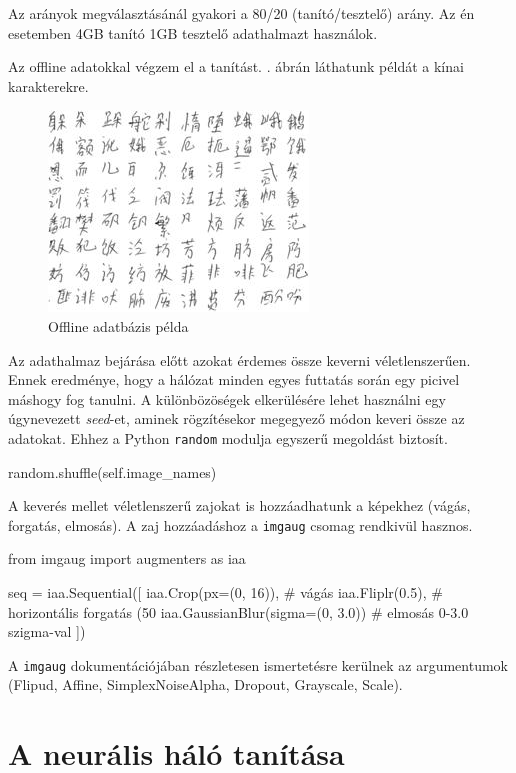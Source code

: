 Az arányok megválasztásánál gyakori a 80/20 (tanító/tesztelő) arány. Az én esetemben 4GB tanító 1GB tesztelő adathalmazt használok.

Az offline adatokkal végzem el a tanítást. . ábrán láthatunk példát a kínai karakterekre.

\begin{figure}[h]
	\centering
	\includegraphics[scale=2.0]{images/offline_dataset}
	\caption{Offline adatbázis példa}
	\label{fig:offline_dataset}
\end{figure} 

Az adathalmaz bejárása előtt azokat érdemes össze keverni véletlenszerűen. Ennek eredménye, hogy a hálózat minden egyes futtatás során egy picivel máshogy fog tanulni. A különbözöségek elkerülésére lehet használni egy úgynevezett \textit{seed}-et, aminek rögzítésekor megegyező módon keveri össze az adatokat. Ehhez a Python \texttt{random} modulja egyszerű megoldást biztosít.
\begin{python}
random.shuffle(self.image_names)
\end{python}

A keverés mellet véletlenszerű zajokat is hozzáadhatunk a képekhez (vágás, forgatás, elmosás). A zaj hozzáadáshoz a \texttt{imgaug} csomag rendkivül hasznos.

\begin{python}
from imgaug import augmenters as iaa

seq = iaa.Sequential([
    iaa.Crop(px=(0, 16)), # vágás 
    iaa.Fliplr(0.5), # horizontális forgatás (50%
    iaa.GaussianBlur(sigma=(0, 3.0)) # elmosás 0-3.0 szigma-val
])
\end{python}

A \texttt{imgaug} dokumentációjában részletesen ismertetésre kerülnek az argumentumok (Flipud, Affine, SimplexNoiseAlpha, Dropout, Grayscale, Scale).

\section{A neurális háló tanítása}

